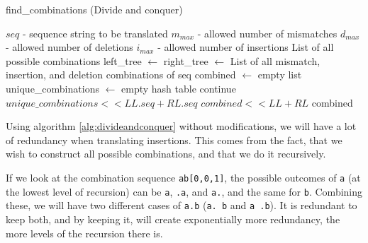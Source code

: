 \documentclass[12pt]{article}
\theoremstyle{definition}
\newcounter{subsubsubsection}[subsubsection]
\newcommand*\Let[2]{\State #1 $\gets$ #2}
\newcommand*\Returns[1]{\State \Return #1}
\newcommand*\Append[2]{\State $#1 << #2$}
\begin{document}
\begin{spacing}{0.8}
\begin{algorithm}[H]
	\caption{find\_combinations (Divide and conquer)}
	\label{alg:divideandconquer}
  	\begin{algorithmic}[1]
    		\Require
    			\Statex $seq$ - sequence string to be translated
    			\Statex $m_{max}$ - allowed number of mismatches
    			\Statex $d_{max}$ - allowed number of deletions
    			\Statex $i_{max}$ - allowed number of insertions
    		\Ensure
    			\Statex List of all possible combinations
		\Statex
    			\Let{left\_tree}{}
    			\Let{right\_tree}{}
    		\Else
    			\Returns{List of all mismatch, insertion, and deletion combinations of seq}
    		\EndIf
    		\State
    		\Let{combined}{empty list}
    		\Let{unique\_combinations}{empty hash table}
    		 
    			 
    					\State continue
    				\EndIf
    					\Append{unique\_combinations}{LL.seq + RL.seq}
    					\Append{combined}{LL + RL}
    				\EndIf
    			\EndFor
    		\EndFor
    		\Returns{combined}
    		\EndFunction
  	\end{algorithmic}
\end{algorithm}
\end{spacing}


Using algorithm \ref{alg:divideandconquer} without modifications, we will have a lot of redundancy when translating insertions. This comes from the fact, that we wish to construct all possible combinations, and that we do it recursively.

If we look at the combination sequence \texttt{ab[0,0,1]}, the possible outcomes of \texttt{a} (at the lowest level of recursion) can be \texttt{a}, \texttt{.a}, and \texttt{a.}, and the same for \texttt{b}. Combining these, we will have two different cases of \texttt{a.b} (\texttt{a. b} and \texttt{a .b}). It is redundant to keep both, and by keeping it, will create exponentially more redundancy, the more levels of the recursion there is.
\end{document}
